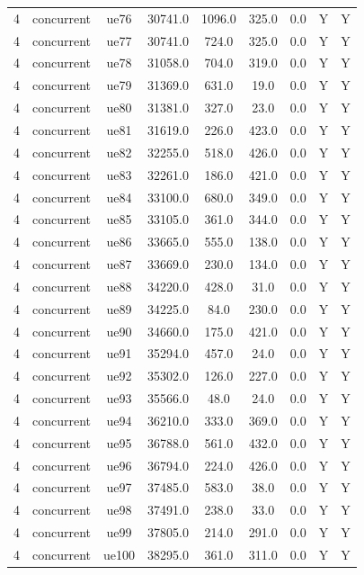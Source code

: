 \begin{table}[ht]
\begin{tabular}{|c|c|c|c|c|c|c|c|c|}
4 & concurrent & ue76 & 30741.0 & 1096.0 & 325.0 & 0.0 & Y & Y \\
4 & concurrent & ue77 & 30741.0 & 724.0 & 325.0 & 0.0 & Y & Y \\
4 & concurrent & ue78 & 31058.0 & 704.0 & 319.0 & 0.0 & Y & Y \\
4 & concurrent & ue79 & 31369.0 & 631.0 & 19.0 & 0.0 & Y & Y \\
4 & concurrent & ue80 & 31381.0 & 327.0 & 23.0 & 0.0 & Y & Y \\
4 & concurrent & ue81 & 31619.0 & 226.0 & 423.0 & 0.0 & Y & Y \\
4 & concurrent & ue82 & 32255.0 & 518.0 & 426.0 & 0.0 & Y & Y \\
4 & concurrent & ue83 & 32261.0 & 186.0 & 421.0 & 0.0 & Y & Y \\
4 & concurrent & ue84 & 33100.0 & 680.0 & 349.0 & 0.0 & Y & Y \\
4 & concurrent & ue85 & 33105.0 & 361.0 & 344.0 & 0.0 & Y & Y \\
4 & concurrent & ue86 & 33665.0 & 555.0 & 138.0 & 0.0 & Y & Y \\
4 & concurrent & ue87 & 33669.0 & 230.0 & 134.0 & 0.0 & Y & Y \\
4 & concurrent & ue88 & 34220.0 & 428.0 & 31.0 & 0.0 & Y & Y \\
4 & concurrent & ue89 & 34225.0 & 84.0 & 230.0 & 0.0 & Y & Y \\
4 & concurrent & ue90 & 34660.0 & 175.0 & 421.0 & 0.0 & Y & Y \\
4 & concurrent & ue91 & 35294.0 & 457.0 & 24.0 & 0.0 & Y & Y \\
4 & concurrent & ue92 & 35302.0 & 126.0 & 227.0 & 0.0 & Y & Y \\
4 & concurrent & ue93 & 35566.0 & 48.0 & 24.0 & 0.0 & Y & Y \\
4 & concurrent & ue94 & 36210.0 & 333.0 & 369.0 & 0.0 & Y & Y \\
4 & concurrent & ue95 & 36788.0 & 561.0 & 432.0 & 0.0 & Y & Y \\
4 & concurrent & ue96 & 36794.0 & 224.0 & 426.0 & 0.0 & Y & Y \\
4 & concurrent & ue97 & 37485.0 & 583.0 & 38.0 & 0.0 & Y & Y \\
4 & concurrent & ue98 & 37491.0 & 238.0 & 33.0 & 0.0 & Y & Y \\
4 & concurrent & ue99 & 37805.0 & 214.0 & 291.0 & 0.0 & Y & Y \\
4 & concurrent & ue100 & 38295.0 & 361.0 & 311.0 & 0.0 & Y & Y \\

\end{tabular}
\end{table}
